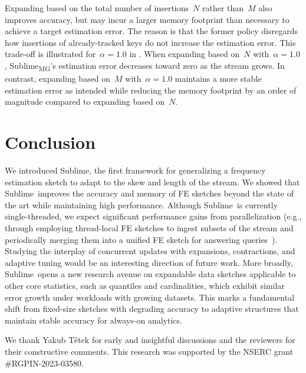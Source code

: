 \documentclass[sigconf]{acmart}
\newcommand{\sketch}{Sublime}
\newcommand{\sketchmg}{\sketch\textsubscript{MG}\xspace}
\begin{document}
Expanding based on the total number of insertions~$N$ rather than~$M$ also improves accuracy, but may incur a larger memory footprint than necessary to achieve a target estimation error.
The reason is that the former policy disregards how insertions of already-tracked keys do not increase the estimation error.
This trade-off is illustrated for~$\alpha=1.0$ in .
When expanding based on~$N$ with~$\alpha=1.0$, \sketchmg's estimation error decreases toward zero as the stream grows.
In contrast, expanding based on~$M$ with~$\alpha=1.0$ maintains a more stable estimation error as intended while reducing the memory footprint by an order of magnitude compared to expanding based on~$N$.

\section{Conclusion}
We introduced \sketch, the first framework for generalizing a frequency estimation sketch to adapt to the skew and length of the stream.
We showed that \sketch\ improves the accuracy and memory of FE sketches beyond the state of the art while maintaining high performance.
Although \sketch\ is currently single-threaded, we expect significant performance gains from parallelization (e.g., through employing thread-local FE sketches to ingest subsets of the stream and periodically merging them into a unified FE sketch for answering queries~\cite{FastConcurrentDataSketches,FPGASketching}).
Studying the interplay of concurrent updates with expansions, contractions, and adaptive tuning would be an interesting direction of future work.
More broadly, \sketch\ opens a new research avenue on expandable data sketches applicable to other core statistics, such as quantiles and cardinalities, which exhibit similar error growth under workloads with growing datasets.
This marks a fundamental shift from fixed-size sketches with degrading accuracy to adaptive structures that maintain stable accuracy for always-on analytics.

\begin{acks}
    We thank Yakub T\v{e}tek for early and insightful discussions and the reviewers for their constructive comments.
    This research was supported by the NSERC grant \#RGPIN-2023-03580.
\end{acks}





\clearpage
\newpage
\end{document}
